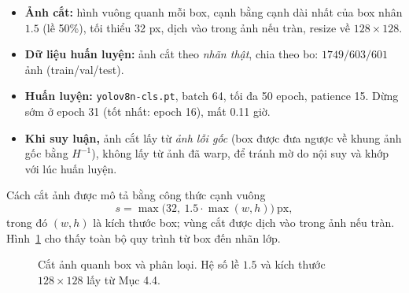 \documentclass[11pt,a4paper]{article}
\newcommand{\hinhref}[1]{Hình~\ref{fig:#1}}
\begin{document}
\begin{itemize}
  \item \textbf{Ảnh cắt:} hình vuông quanh mỗi box, cạnh bằng cạnh dài nhất của box nhân $1.5$ (lề 50\%), tối thiểu 32 px, dịch vào trong ảnh nếu tràn, resize về $128\times128$.
  \item \textbf{Dữ liệu huấn luyện:} ảnh cắt theo \emph{nhãn thật}, chia theo bo: $1749 / 603 / 601$ ảnh (train/val/test).
  \item \textbf{Huấn luyện:} \texttt{yolov8n-cls.pt}, batch 64, tối đa 50 epoch, patience 15. Dừng sớm ở epoch 31 (tốt nhất: epoch 16), mất 0.11 giờ.
  \item \textbf{Khi suy luận,} ảnh cắt lấy từ \emph{ảnh lỗi gốc} (box được đưa ngược về khung ảnh gốc bằng $H^{-1}$), không lấy từ ảnh đã warp, để tránh mờ do nội suy và khớp với lúc huấn luyện.
\end{itemize}

Cách cắt ảnh được mô tả bằng công thức cạnh vuông
\begin{equation}\label{eq:crop}
s=\max\bigl(32,\ 1.5\cdot\max(w,h)\bigr)\ \text{px},
\end{equation}
trong đó $(w,h)$ là kích thước box; vùng cắt được dịch vào trong ảnh nếu tràn. \hinhref{crop} cho thấy toàn bộ quy trình từ box đến nhãn lớp.

\begin{figure}[H]
\centering
{}
\caption{Cắt ảnh quanh box và phân loại. Hệ số lề $1.5$ và kích thước $128\times128$ lấy từ Mục 4.4.}
\label{fig:crop}
\end{figure}
\end{document}
